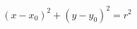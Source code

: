 \documentclass[preview]{standalone}
\begin{document}
\begin{align*}
(x - x_0)^2 + (y - y_0)^2  = r^2
\end{align*}
\end{document}
